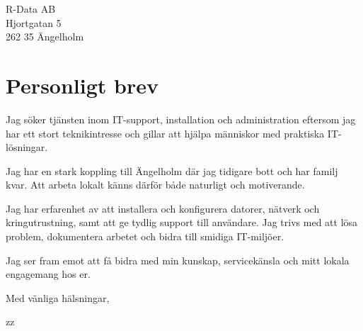 \documentclass[a4paper,11pt]{letter}
\date{\today}
\begin{document}
\begin{letter}{R-Data AB\\Hjortgatan 5\\262 35 Ängelholm}
\section*{Personligt brev}



Jag söker tjänsten inom IT-support, installation och administration eftersom jag har ett stort teknikintresse och gillar att hjälpa människor med praktiska IT-lösningar.

Jag har en stark koppling till Ängelholm där jag tidigare bott och har familj kvar. Att arbeta lokalt känns därför både naturligt och motiverande.

Jag har erfarenhet av att installera och konfigurera datorer, nätverk och kringutrustning, samt att ge tydlig support till användare. Jag trivs med att lösa problem, dokumentera arbetet och bidra till smidiga IT-miljöer.

Jag ser fram emot att få bidra med min kunskap, servicekänsla och mitt lokala engagemang hos er.


\closing{Med vänliga hälsningar,}
zz
\end{letter}
\end{document}
